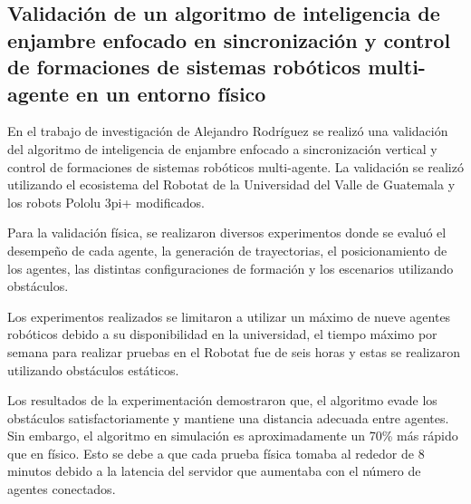 \subsection*{Validación de un algoritmo de inteligencia de enjambre enfocado en sincronización y control de formaciones de sistemas robóticos multi-agente en un entorno físico}
En el trabajo de investigación de Alejandro Rodríguez \cite{RodriguezJA_2023_tesis}se realizó una validación del algoritmo de inteligencia de enjambre enfocado a sincronización vertical y control de formaciones de sistemas robóticos multi-agente. La validación se realizó utilizando el ecosistema del Robotat de la Universidad del Valle de Guatemala y los robots Pololu 3pi+ modificados.

Para la validación física, se realizaron diversos experimentos donde se evaluó el desempeño de cada agente, la generación de trayectorias, el posicionamiento de los agentes, las distintas configuraciones de formación y los escenarios utilizando obstáculos.

Los experimentos realizados se limitaron a utilizar un máximo de nueve agentes robóticos debido a su disponibilidad en la universidad, el tiempo máximo por semana para realizar pruebas en el Robotat fue de seis horas y estas se realizaron utilizando obstáculos estáticos.

Los resultados de la experimentación demostraron que, el algoritmo evade los obstáculos satisfactoriamente y mantiene una distancia adecuada entre agentes. Sin embargo, el algoritmo en simulación es aproximadamente un 70\% más rápido que en físico. Esto se debe a que cada prueba física tomaba al rededor de 8 minutos debido a la latencia del servidor que aumentaba con el número de agentes conectados. 


